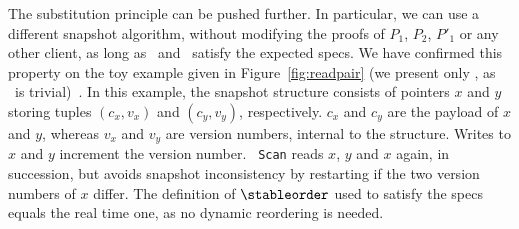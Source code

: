 




The substitution principle can be pushed further. In particular, we
can use a different snapshot algorithm, without modifying the proofs
of $P_1$, $P_2$, $P'_1$ or any other client, as long as \jywrite\ and
\jyscan\ satisfy the expected specs.
%
We have confirmed this property on the toy example given in
Figure~\ref{fig:readpair} (we present only \jyscan, as \jywrite\ is
trivial)~\cite{SergeyNB+ESOP15}. In this example, the snapshot
structure consists of pointers $x$ and $y$ storing tuples $(c_x, v_x)$
and $(c_y, v_y)$, respectively. $c_x$ and $c_y$ are the payload of $x$
and $y$, whereas $v_x$ and $v_y$ are version numbers, internal to the
structure. Writes to $x$ and $y$ increment the version number. {\tt
  Scan} reads $x$, $y$ and $x$ again, in succession, but avoids
snapshot inconsistency by restarting if the two version numbers of $x$
differ. The definition of $\stableorder$ used to satisfy the specs
equals the real time one, as no dynamic reordering is needed.






